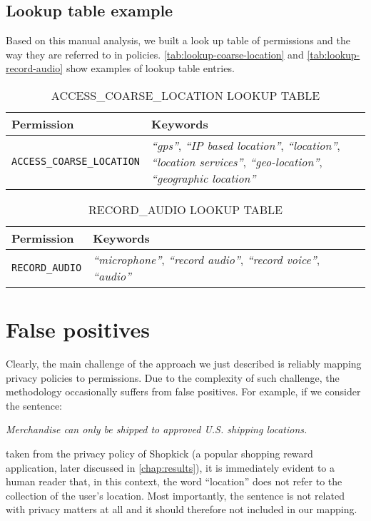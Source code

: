 \subsection{Lookup table example}
Based on this manual analysis, we built a look up table of permissions and the way they are referred to in policies. \autoref{tab:lookup-coarse-location} and \autoref{tab:lookup-record-audio} show examples of lookup table entries.

\begin{table}[tbh]
    \caption{ACCESS\_COARSE\_LOCATION LOOKUP TABLE}
    \label{tab:lookup-coarse-location}
    \centering
    \begin{tabular}{lp{6cm}}
        \toprule
            Permission   & Keywords \\
            \midrule
                \texttt{ACCESS\_COARSE\_LOCATION}  & \emph{``gps''}, \emph{``IP based location''}, \emph{``location''}, \emph{``location services''}, \emph{``geo-location''}, \emph{``geographic location''} \\
        \bottomrule
    \end{tabular}
\end{table}

\begin{table}[tbh]
    \caption{RECORD\_AUDIO LOOKUP TABLE}
    \label{tab:lookup-record-audio}
    \centering
    \begin{tabular}{lp{9cm}}
        \toprule
            Permission   & Keywords \\
            \midrule
                \texttt{RECORD\_AUDIO}  & \emph{``microphone''}, \emph{``record audio''}, \emph{``record voice''}, \emph{``audio''} \\
        \bottomrule
    \end{tabular}
\end{table}

\section{False positives}
\label{sec:false-positives}
Clearly, the main challenge of the approach we just described is reliably mapping privacy policies to permissions.
Due to the complexity of such challenge, the methodology occasionally suffers from false positives. For example, if we consider the sentence:

\emph{Merchandise can only be shipped to approved U.S. shipping locations.}

taken from the privacy policy of Shopkick (a popular shopping reward application, later discussed in \autoref{chap:results}), it is immediately evident to a human reader that, in this context, the word ``location'' does not refer to the collection of the user's location.
Most importantly, the sentence is not related with privacy matters at all and it should therefore not included in our mapping.

